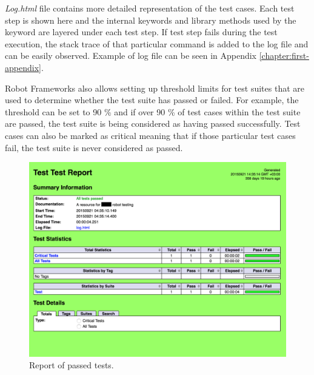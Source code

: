 \emph{Log.html} file contains more detailed representation of the test cases. Each test step is shown here and the internal keywords and library methods used by the keyword are layered under each test step. If test step fails during the test execution, the stack trace of that particular command is added to the log file and can be easily observed. Example of log file can be seen in Appendix \ref{chapter:first-appendix}.

Robot Frameworks also allows setting up threshold limits for test suites that are used to determine whether the test suite has passed or failed. For example, the threshold can be set to 90 \% and if over 90 \% of test cases within the test suite are passed, the test suite is being considered as having passed successfully. Test cases can also be marked as critical meaning that if those particular test cases fail, the test suite is never considered as passed.

\begin{figure}[ht]
  \begin{center}
    \includegraphics[width=\textwidth]{images/passed_report.png}
    \caption{Report of passed tests.}
    \label{fig:passed report}
  \end{center}
\end{figure}
\FloatBarrier

